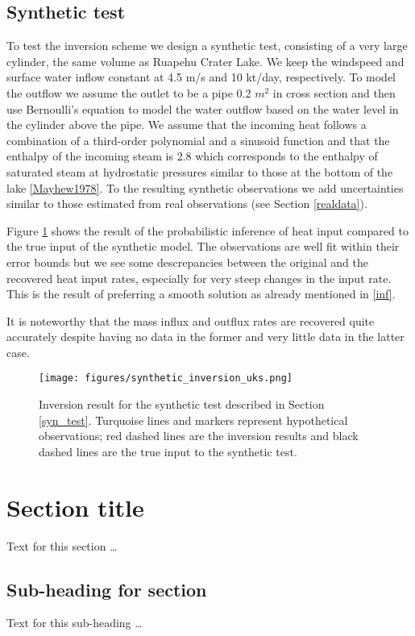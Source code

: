 \documentclass{bmc_template/bmcart}
\begin{document}
\subsection*{Synthetic test}\label{syn_test}
To test the inversion scheme we design a synthetic test, consisting of a very
large cylinder, the same volume as Ruapehu Crater Lake. We keep the windspeed
and surface water inflow constant at 4.5 m/s and 10 kt/day, respectively. To
model the outflow we assume the outlet to be a pipe 0.2 $m^2$ in cross section
and then use Bernoulli's equation to model the water outflow based on the water
level in the cylinder above the pipe. We assume that the incoming heat follows
a combination of a third-order polynomial and a sinusoid function and that the
enthalpy of the incoming steam is 2.8 which corresponds to the enthalpy of
saturated steam at hydrostatic pressures similar to those at the bottom of the
lake \ref{Mayhew1978}. To the resulting synthetic observations we add
uncertainties similar to those estimated from real observations (see Section
\ref{realdata}).

Figure \ref{syn_example} shows the result of the probabilistic inference of
heat input compared to the true input of the synthetic model. The observations
are well fit within their error bounds but we see some descrepancies between
the original and the recovered heat input rates, especially for very steep
changes in the input rate. This is the result of preferring a smooth solution
as already mentioned in \ref{inf}.

It is noteworthy that the mass influx and outflux rates are recovered quite accurately despite having no data in the former and very little data in the latter case.

\begin{figure}
	\texttt{[image: figures/synthetic\_inversion\_uks.png]}  
    \caption{Inversion result for the synthetic test described in Section 
        \ref{syn_test}. Turquoise lines and markers represent hypothetical
        observations; red dashed lines are the inversion results and black
        dashed lines are the true input to the synthetic test.}
  \label{syn_example}
\end{figure}


\section*{Section title}
Text for this section \ldots
\subsection*{Sub-heading for section}
Text for this sub-heading \ldots
\end{document}
